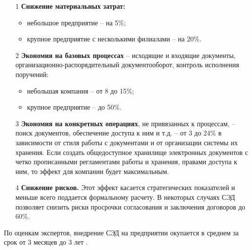 \begin{itemize}
  \item[1] \textbf{Снижение материальных затрат:}
	
	\begin{itemize}
	  \item небольшое предприятие – на 5\%;
	  \item крупное предприятие с несколькими филиалами – на 20\%.
	\end{itemize}

  \item[2] \textbf{Экономия на базовых процессах} – исходящие и входящие документы, организационно-распорядительный документооборот, контроль исполнения поручений:
	
	\begin{itemize}
	  \item небольшая компания – от 8 до 15\%;
	  \item крупное предприятие – до 50\%.
	\end{itemize}
	
  \item[3] \textbf{Экономия на конкретных операциях}, не привязанных к процессам, – поиск документов, обеспечение доступа к ним и т.д. – от 3 до 24\% в зависимости от стиля работы с документами и от организации системы их хранения. Если создать общедоступное хранилище электронных документов с четко прописанными регламентами работы и хранения, правами доступа к ним, то эффект для компании будет максимальным.

  \item[4] \textbf{Снижение рисков.} Этот эффект касается стратегических показателей и меньше всего поддается формальному расчету. В некоторых случаях СЭД позволяет снизить риски просрочки согласования и заключения договоров до 60\%.

\end{itemize}

По оценкам экспертов, внедрение СЭД на предприятии окупается в среднем за срок от 3 месяцев до 3 лет \cite{ecm_journal}.
